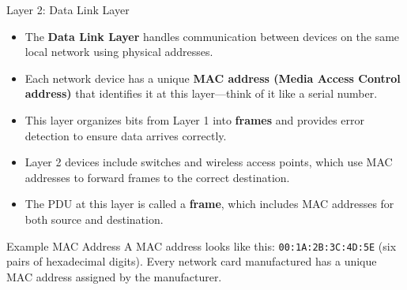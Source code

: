 \documentclass[aspectratio=169]{beamer}
\begin{document}
\begin{frame}{Layer 2: Data Link Layer}

\begin{itemize}
    \item The \textbf{Data Link Layer} handles communication between devices on the same local network using physical addresses.
    \item Each network device has a unique \textbf{MAC address (Media Access Control address)} that identifies it at this layer—think of it like a serial number.
    \item This layer organizes bits from Layer 1 into \textbf{frames} and provides error detection to ensure data arrives correctly.
    \item Layer 2 devices include switches and wireless access points, which use MAC addresses to forward frames to the correct destination.
    \item The PDU at this layer is called a \textbf{frame}, which includes MAC addresses for both source and destination.
\end{itemize}

\vspace{0.3cm}

\begin{block}{Example MAC Address}
A MAC address looks like this: \texttt{00:1A:2B:3C:4D:5E} (six pairs of hexadecimal digits). Every network card manufactured has a unique MAC address assigned by the manufacturer.
\end{block}

\end{frame}
\end{document}
